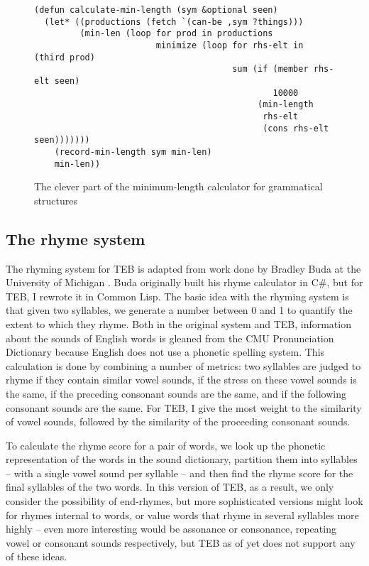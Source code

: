 \documentclass[12pt]{article}
\begin{document}
\begin{figure}
\begin{center}
\begin{verbatim}
(defun calculate-min-length (sym &optional seen)
  (let* ((productions (fetch `(can-be ,sym ?things)))
         (min-len (loop for prod in productions
                        minimize (loop for rhs-elt in (third prod)
                                       sum (if (member rhs-elt seen)
                                               10000
                                            (min-length
                                             rhs-elt
                                             (cons rhs-elt seen)))))))
    (record-min-length sym min-len)
    min-len))
\end{verbatim}
\caption{The clever part of the minimum-length calculator for grammatical
structures}
\label{calculate-min-length}
\end{center}
\end{figure}

\subsection{The rhyme system}
\label{rhymesystem}
The rhyming system for TEB is adapted from work done by Bradley Buda at the
University of Michigan \cite{buda}. Buda originally built his rhyme
calculator in C\#, but for TEB, I rewrote it in Common Lisp. The basic idea
with the rhyming system is that given two syllables, we generate a number
between 0 and 1 to quantify the extent to which they rhyme. Both in the
original system and TEB, information about the sounds of English words is
gleaned from the CMU Pronunciation Dictionary \cite{cmudict} because
English does not use a phonetic spelling system. This calculation is done
by combining a number of metrics: two syllables are judged to rhyme if they
contain similar vowel sounds, if the stress on these vowel sounds is the
same, if the preceding consonant sounds are the same, and if the following
consonant sounds are the same. For TEB, I give the most weight to the
similarity of vowel sounds, followed by the similarity of the proceeding
consonant sounds.

\bigskip
To calculate the rhyme score for a pair of words, we look up the phonetic
representation of the words in the sound dictionary, partition them into
syllables -- with a single vowel sound per syllable -- and then find the
rhyme score for the final syllables of the two words. In this version of
TEB, as a result, we only consider the possibility of end-rhymes, but
more sophisticated versions might look for rhymes internal to words, or
value words that rhyme in several syllables more highly -- even more
interesting would be assonance or consonance, repeating vowel or consonant
sounds respectively, but TEB as of yet does not support any of these ideas.
\end{document}
